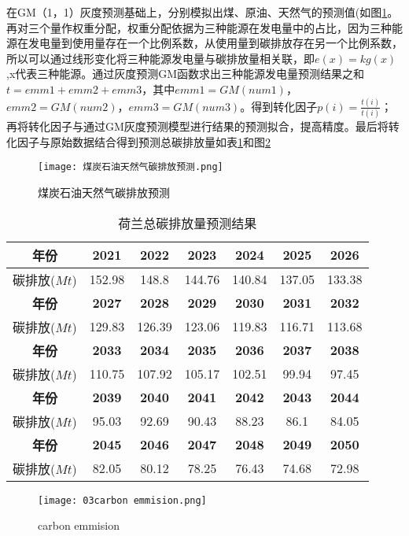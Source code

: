 \documentclass[bwprint]{gmcmthesis}
\numberwithin{figure}{section}
\begin{document}
在GM（1，1）灰度预测基础上，分别模拟出煤、原油、天然气的预测值(如图\ref{fig_{10}}。再对三个量作权重分配，权重分配依据为三种能源在发电量中的占比，因为三种能源在发电量到使用量存在一个比例系数，从使用量到碳排放存在另一个比例系数，所以可以通过线形变化将三种能源发电量与碳排放量相关联，即$e(x)=kg(x)$,x代表三种能源。通过灰度预测GM函数求出三种能源发电量预测结果之和$t=emm1+emm2+emm3$，其中$emm1=GM(num1)$，$emm2=GM(num2)$，$emm3=GM(num3)$。得到转化因子$p(i)=\frac{t(i)}{t(i)}$；再将转化因子与通过GM灰度预测模型进行结果的预测拟合，提高精度。最后将转化因子与原始数据结合得到预测总碳排放量如表\ref{table_{2}}和图\ref{fig_{3}}
\begin{figure}[!h]
	\centering
	\texttt{[image: 煤炭石油天然气碳排放预测.png]}
	\caption{煤炭石油天然气碳排放预测}
	\label{fig_{10}}
\end{figure}
\begin{table}[]
	\centering
	\begin{tabular}{|c|c|c|c|c|c|c|}
	\hline
	\textbf{年份} &\textbf{2021} & \textbf{2022} & \textbf{2023} & \textbf{2024} & \textbf{2025} & \textbf{2026} \\ \hline
	碳排放($Mt$)&152.98        & 148.8         & 144.76        & 140.84        & 137.05        & 133.38        \\ \hline
	\textbf{年份} &\textbf{2027} & \textbf{2028} & \textbf{2029} & \textbf{2030} & \textbf{2031} & \textbf{2032} \\ \hline
	碳排放($Mt$)&129.83        & 126.39        & 123.06        & 119.83        & 116.71        & 113.68        \\ \hline
	\textbf{年份} &\textbf{2033} & \textbf{2034} & \textbf{2035} & \textbf{2036} & \textbf{2037} & \textbf{2038} \\ \hline
	碳排放($Mt$)&110.75        & 107.92        & 105.17        & 102.51        & 99.94         & 97.45         \\ \hline
	\textbf{年份} &\textbf{2039} & \textbf{2040} & \textbf{2041} & \textbf{2042} & \textbf{2043} & \textbf{2044} \\ \hline
	碳排放($Mt$)&95.03         & 92.69         & 90.43         & 88.23         & 86.1          & 84.05         \\ \hline
	\textbf{年份} &\textbf{2045} & \textbf{2046} & \textbf{2047} & \textbf{2048} & \textbf{2049} & \textbf{2050} \\ \hline
	碳排放($Mt$)&82.05         & 80.12         & 78.25         & 76.43         & 74.68         & 72.98         \\ \hline
	\end{tabular}
	\caption{荷兰总碳排放量预测结果}
	\label{table_{2}}
	\end{table}
	\begin{figure}[!h]
		\centering
		\texttt{[image: 03carbon emmision.png]}
		\caption{carbon emmision}
		\label{fig_{3}}
	\end{figure}
\end{document}
